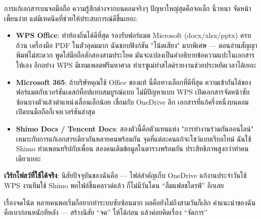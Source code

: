 


การแก้เอกสารบนจอมือถือ ความรู้สึกต่างจากบนคอมจริงๆ ปัญหาใหญ่สุดคือจอเล็ก นิ้วหนา จัดหน้าเพี้ยนง่าย แต่มีเทคนิคที่ช่วยให้ประสบการณ์ดีขึ้นเยอะ:

\begin{itemize}
  \item \textbf{WPS Office}: ทำท้องถิ่นได้ดีที่สุด รองรับฟอร์แมต Microsoft (docx/xlsx/pptx) ครบถ้วน เครื่องมือ PDF ในตัวอุดมมาก ฉันชอบฟังก์ชัน "โน้ตเสียง" มากพิเศษ — ตอนอ่านสัญญาพิมพ์ไม่สะดวก พูดใส่มือถือสักสองสามประโยค มันจะแปลงเป็นคำอธิบายข้อความแปะในเอกสารให้เอง อีกอย่าง WPS มีเทมเพลตฟรีมหาศาล ทำเรซูเม่ทำสไลด์รายงานช่วยประหยัดเวลาได้เยอะ
  \item \textbf{Microsoft 365}: ถ้าบริษัทคุณใช้ Office ของแท้ นี่คือทางเลือกที่ดีที่สุด ความเข้ากันได้ของฟอร์แมตกับเวอร์ชันเดสก์ท็อปแทบสมบูรณ์แบบ ไม่มีปัญหาแบบ WPS เปิดเอกสารจัดหน้าซับซ้อนบางตัวแล้วตำแหน่งเลื่อนเล็กน้อย เชื่อมกับ OneDrive ลึก เอกสารที่แก้ครึ่งหนึ่งบนคอม เปิดบนมือถือก็เจอเวอร์ชันล่าสุด
  \item \textbf{Shimo Docs / Tencent Docs}: สองตัวนี้คือตัวแทนแห่ง "การทำงานร่วมกันออนไลน์" เหมาะกับการแก้เอกสารเดียวกันหลายคนพร้อมกัน จุดที่แต่ละคนแก้จะโชว์แบบเรียลไทม์ ฉันใช้ Shimo ทำแพลนทริปกับเพื่อน สองคนเติมข้อมูลในตารางพร้อมกัน ประสิทธิภาพสูงกว่าทำคนเดียวเยอะ
\end{itemize}

\textbf{เวิร์กโฟลว์ที่ใช้ได้จริง}: นิสัยปัจจุบันของฉันคือ — ไฟล์สำคัญเก็บ OneDrive แก้งานประจำวันใช้ WPS งานทีมใช้ Shimo พอไฟล์ขึ้นคลาวด์แล้ว ก็ไม่มีวันโดน “ลืมแฟลชไดรฟ์” อีกเลย


เรื่องจดโน้ต หลายคนพอเริ่มก็อยากทำระบบซับซ้อนมาก ผลคือยังไม่ถึงสามวันก็เลิก คำแนะนำของฉันคือเบาก่อนหนักทีหลัง — สร้างนิสัย “จด” ให้ได้ก่อน แล้วค่อยคิดเรื่อง “จัดการ”

